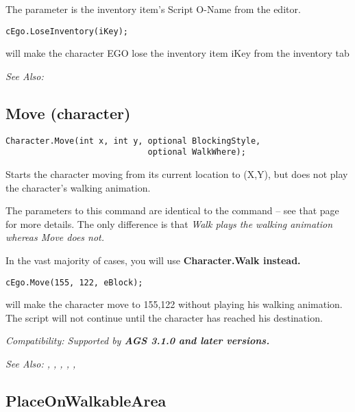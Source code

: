 The parameter is the inventory item's Script O-Name from the editor.

\begin{verbatim}
cEgo.LoseInventory(iKey);
\end{verbatim}
will make the character EGO lose the inventory item iKey from the inventory tab

\it{See Also:} 


\subsection{Move (character)}\label{Character.Move}%

\begin{verbatim}
Character.Move(int x, int y, optional BlockingStyle,
                             optional WalkWhere);
\end{verbatim}
Starts the character moving from its current location to (X,Y), but does
not play the character's walking animation.

The parameters to this command are identical to the 
command -- see that page for more details. The only difference is that \it{Walk}
plays the walking animation whereas \it{Move} does not.

In the vast majority of cases, you will use \bf{Character.Walk} instead.

\begin{verbatim}
cEgo.Move(155, 122, eBlock);
\end{verbatim}
will make the character move to 155,122 without playing his walking animation.
The script will not continue until the character has reached his destination.

\it{Compatibility:} Supported by \bf{AGS 3.1.0} and later versions.

\it{See Also:} ,
,
,
,
,


\subsection{PlaceOnWalkableArea}\label{Character.PlaceOnWalkableArea}%

